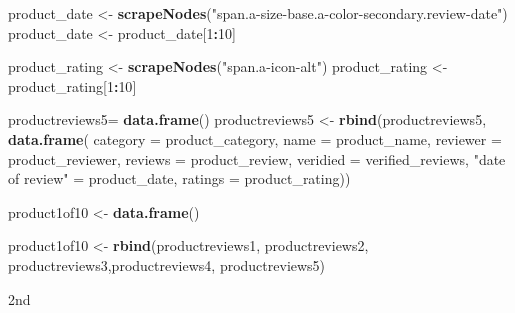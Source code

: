 \documentclass[
]{article}
\newenvironment{Shaded}{\begin{snugshade}}{\end{snugshade}}
\newcommand{\AttributeTok}[1]{\textcolor[rgb]{0.13,0.29,0.53}{#1}}
\newcommand{\DecValTok}[1]{\textcolor[rgb]{0.00,0.00,0.81}{#1}}
\newcommand{\FunctionTok}[1]{\textcolor[rgb]{0.13,0.29,0.53}{\textbf{#1}}}
\newcommand{\NormalTok}[1]{#1}
\newcommand{\OtherTok}[1]{\textcolor[rgb]{0.56,0.35,0.01}{#1}}
\newcommand{\SpecialCharTok}[1]{\textcolor[rgb]{0.81,0.36,0.00}{\textbf{#1}}}
\newcommand{\StringTok}[1]{\textcolor[rgb]{0.31,0.60,0.02}{#1}}
\begin{document}
\begin{Shaded}
\begin{Highlighting}[]
\NormalTok{  product\_date }\OtherTok{\textless{}{-}} \FunctionTok{scrapeNodes}\NormalTok{(}\StringTok{"span.a{-}size{-}base.a{-}color{-}secondary.review{-}date"}\NormalTok{)}
\NormalTok{  product\_date }\OtherTok{\textless{}{-}}\NormalTok{ product\_date[}\DecValTok{1}\SpecialCharTok{:}\DecValTok{10}\NormalTok{]}
  
\NormalTok{  product\_rating }\OtherTok{\textless{}{-}} \FunctionTok{scrapeNodes}\NormalTok{(}\StringTok{"span.a{-}icon{-}alt"}\NormalTok{)}
\NormalTok{  product\_rating }\OtherTok{\textless{}{-}}\NormalTok{ product\_rating[}\DecValTok{1}\SpecialCharTok{:}\DecValTok{10}\NormalTok{]}
  
\NormalTok{  productreviews5}\OtherTok{=} \FunctionTok{data.frame}\NormalTok{()}
\NormalTok{  productreviews5 }\OtherTok{\textless{}{-}} \FunctionTok{rbind}\NormalTok{(productreviews5, }\FunctionTok{data.frame}\NormalTok{(}
                      \AttributeTok{category =}\NormalTok{ product\_category,}
                      \AttributeTok{name =}\NormalTok{ product\_name,}
                      \AttributeTok{reviewer =}\NormalTok{ product\_reviewer,}
                      \AttributeTok{reviews =}\NormalTok{ product\_review,}
                      \AttributeTok{veridied =}\NormalTok{ verified\_reviews,}
                      \StringTok{"date of review"} \OtherTok{=}\NormalTok{ product\_date,}
                      \AttributeTok{ratings =}\NormalTok{ product\_rating))}
  
\NormalTok{  product1of10 }\OtherTok{\textless{}{-}} \FunctionTok{data.frame}\NormalTok{()}
  
\NormalTok{  product1of10 }\OtherTok{\textless{}{-}} \FunctionTok{rbind}\NormalTok{(productreviews1, productreviews2, productreviews3,productreviews4, productreviews5)}
\end{Highlighting}
\end{Shaded}

2nd
\end{document}
